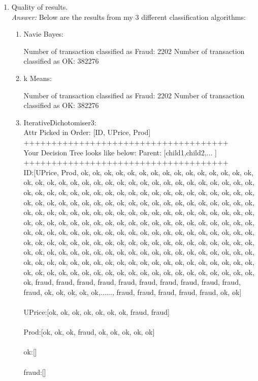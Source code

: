 \documentclass{article}
\begin{document}
\begin{enumerate}
		\item Quality of results. \\
		\emph{Answer:} Below are the results from my 3 different classification algorithms:
		\begin{enumerate}
			\item Navie Bayes:
			\begin{Sinput}
Number of transaction classified as Fraud:	2202
Number of transaction classified as OK:	382276
			\end{Sinput}
			\item k Means:
			\begin{Sinput}
Number of transaction classified as Fraud:	2202
Number of transaction classified as OK:	382276
			\end{Sinput}
			\item IterativeDichotomiser3:\\
Attr Picked in Order:	[ID, UPrice, Prod]\\
+++++++++++++++++++++++++++++++++++++\\
Your Decision Tree looks like below: Parent: [child1,child2,... ]
+++++++++++++++++++++++++++++++++++++\\
ID:[UPrice, Prod, ok, ok, ok, ok, ok, ok, ok, ok, ok, ok, ok, ok, ok, ok, ok, ok, ok, ok, ok, ok, ok, ok, ok, ok, ok, ok, ok, ok, ok, ok, ok, ok, ok, ok, ok, ok, ok, ok, ok, ok, ok, ok, ok, ok, ok, ok, ok, ok, ok, ok, ok, ok, ok, ok, ok, ok, ok, ok, ok, ok, ok, ok, ok, ok, ok, ok, ok, ok, ok, ok, ok, ok, ok, ok, ok, ok, ok, ok, ok, ok, ok, ok, ok, ok, ok, ok, ok, ok, ok, ok, ok, ok, ok, ok, ok, ok, ok, ok, ok, ok, ok, ok, ok, ok, ok, ok, ok, ok, ok, ok, ok, ok, ok, ok, ok, ok, ok, ok, ok, ok, ok, ok, ok, ok, ok, ok, ok, ok, ok, ok, ok, ok, ok, ok, ok, ok, ok, ok, ok, ok, ok, ok, ok, ok, ok, ok, ok, ok, ok, ok, ok, ok, ok, ok, ok, ok, ok, ok, ok, ok, ok, ok, ok, ok, ok, ok, ok, ok, ok, ok, ok, ok, ok, ok, ok, ok, ok, ok, ok, ok, ok, ok, ok, ok, ok, ok, ok, ok, ok, ok, ok, ok, ok, ok, ok, ok, ok, ok, ok, ok, ok, ok, ok, ok, ok, ok, ok, ok, ok, ok, ok, ok, ok, ok, ok, ok, fraud, fraud, fraud, fraud, fraud, fraud, fraud, fraud, fraud, fraud, fraud, ok, ok, ok, ok, ok,......, fraud, fraud, fraud, fraud, fraud, ok, ok]\\
\\ UPrice:[ok, ok, ok, ok, ok, ok, ok, fraud, fraud]\\
\\ Prod:[ok, ok, ok, fraud, ok, ok, ok, ok, ok]\\
\\ ok:[]\\
\\ fraud:[]\\
		\end{enumerate}


\end{enumerate}
\end{document}
